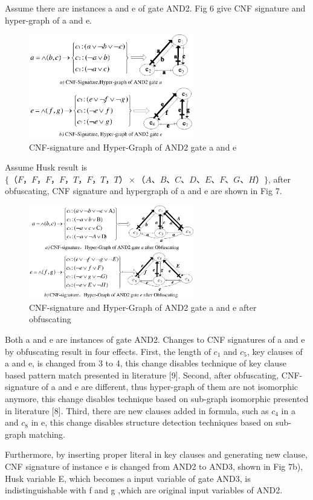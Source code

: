 \documentclass[runningheads,a4paper]{llncs}
\begin{document}
\setlength{\parindent}{2em} 
Assume there are instances a and e of gate AND2. Fig 6 give CNF signature and hyper-graph of a and e.
\begin{figure}
\centering
\includegraphics[width=7.2cm]{a6}
\caption{CNF-signature and Hyper-Graph of AND2 gate a and e}
\end{figure}
Assume Husk result is $\{（F，F，F，F，T，F，T，T）\times（A、B、C、D、E、F、G、H）\}$, after obfuscating, CNF signature and hypergraph of a and e are shown in Fig 7.
\begin{figure}
\centering
\includegraphics[width=7.2cm]{a7}
\caption{CNF-signature and Hyper-Graph of AND2 gate a and e after obfuscating}
\end{figure}
Both a and e are instances of gate AND2. Changes to CNF signatures of a and e by obfuscating result in four effects.
First, the length of $c_1$ and $c_5$, key clauses of a and e, is changed from 3 to 4, this change disables technique of key clause based pattern match presented in literature [9].
Second, after obfuscating, CNF-signature of a and e are different, thus hyper-graph of them are not isomorphic anymore, 
this change disables technique based on sub-graph isomorphic presented in literature [8].
Third, there are new clauses added in formula, such as $c_4$ in a and $c_8$ in e, this change disables structure detection techniques based on sub-graph matching. 

Furthermore, by inserting proper literal in key clauses and generating new clause, CNF signature of instance e is changed from AND2 to AND3, shown in Fig 7b),
Husk variable E, which becomes a input variable of gate AND3, is indistinguishable with f and g ,which are original input variables of AND2.
\end{document}
